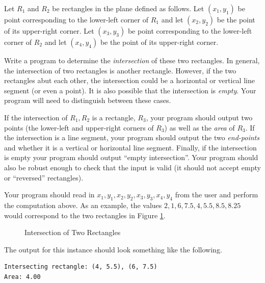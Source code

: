 \begin{exer}
Let $R_1$ and $R_2$ be rectangles in the plane defined as follows.  Let $(x_1, y_1)$ be
point corresponding to the lower-left corner of $R_1$ and let $(x_2, y_2)$ be the point of its
upper-right corner.  Let $(x_3, y_3)$ be point corresponding to the lower-left corner of $R_2$
and let $(x_4, y_4)$ be the point of its upper-right corner.

Write a program to determine the \emph{intersection} of these two rectangles.  In general,
the intersection of two rectangles is another rectangle.  However, if the two rectangles abut each
other, the intersection could be a horizontal or vertical line segment (or even a point).  It is also possible that the
intersection is \emph{empty}.  Your program will need to distinguish between these cases.

If the intersection of $R_1, R_2$ is a rectangle, $R_3$, your program should output two
points (the lower-left and upper-right corners of $R_3$) as well as the \emph{area} of $R_3$.
If the intersection is a line segment, your program should output the two \emph{end-points}
and whether it is a vertical or horizontal line segment.  Finally, if the intersection is empty your
program should output ``empty intersection''.  Your program should also be robust enough to
check that the input is valid (it should not accept empty or ``reversed'' rectangles).

Your program should read in $x_1, y_1, x_2, y_2, x_3, y_3, x_4, y_4$ from the user and
perform the computation above.  As an example, the values  $2, 1, 6, 7.5, 4, 5.5, 8.5, 8.25$
would correspond to the two rectangles in Figure \ref{fig:rectangleIntersection}.

\begin{figure}
\centering

\caption{Intersection of Two Rectangles}
\label{fig:rectangleIntersection}
\end{figure}

The output for this instance should look something like the following.

\begin{verbatim}
Intersecting rectangle: (4, 5.5), (6, 7.5)
Area: 4.00
\end{verbatim}
\end{exer}

